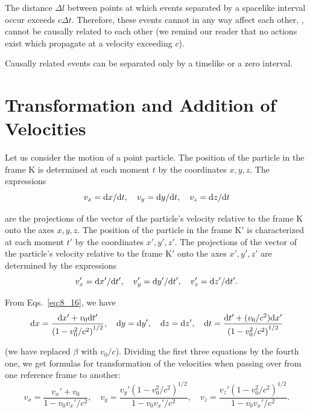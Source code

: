 The distance $\Delta l$ between points at which events separated by a spacelike interval occur exceeds $c\Delta t$. Therefore, these events cannot in any way affect each other, \ie, cannot be causally related to each other (we remind our reader that no actions exist which propagate at a velocity exceeding $c$).

Causally related events can be separated only by a timelike or a zero interval.

\section{Transformation and Addition of Velocities}\label{sec:8_5}

Let us consider the motion of a point particle. The position of the particle in the frame K is determined at each moment $t$ by the coordinates $x, y, z$. The expressions
\begin{equation*}
	v_x = \mathrm{d} x/\mathrm{d} t,\quad v_y = \mathrm{d} y/\mathrm{d} t,\quad v_z = \mathrm{d} z/\mathrm{d} t
\end{equation*}

\noindent
are the projections of the vector of the particle's velocity relative to the frame K onto the axes $x, y, z$. The position of the particle in the frame K$'$ is characterized at each moment $t'$ by the coordinates $x', y', z'$. The projections of the vector of the particle's velocity relative to the frame K$'$ onto the axes $x', y', z'$ are determined by the expressions
\begin{equation*}
	v_x' = \mathrm{d} x'/\mathrm{d} t',\quad v_y' = \mathrm{d} y'/\mathrm{d} t',\quad v_z' = \mathrm{d} z'/\mathrm{d} t'.
\end{equation*}

From Eqs.~\eqref{eq:8_16}, we have
\begin{equation*}
	\mathrm{d} x = \frac{\mathrm{d} x'+v_0\mathrm{d} t'}{\left(1-v_0^2/c^2\right)^{1/2}},\quad \mathrm{d} y = \mathrm{d} y',\quad \mathrm{d} z = \mathrm{d} z',\quad \mathrm{d} t = \frac{\mathrm{d} t'+(v_0/c^2)\mathrm{d} x'}{\left(1-v_0^2/c^2\right)^{1/2}}
\end{equation*}

\noindent
(we have replaced $\beta$ with $v_0/c$). Dividing the first three equations by the fourth one, we get formulas for transformation of the velocities when passing over from one reference frame to another:
\begin{equation}\label{eq:8_27}
	v_x = \frac{v_x'+v_0}{1 - v_0v_x'/c^2},\quad  v_y = \frac{v_y'\left(1-v_0^2/c^2\right)^{1/2}}{1 - v_0v_x'/c^2},\quad v_z = \frac{v_z'\left(1-v_0^2/c^2\right)^{1/2}}{1 - v_0v_x'/c^2}.
\end{equation}

